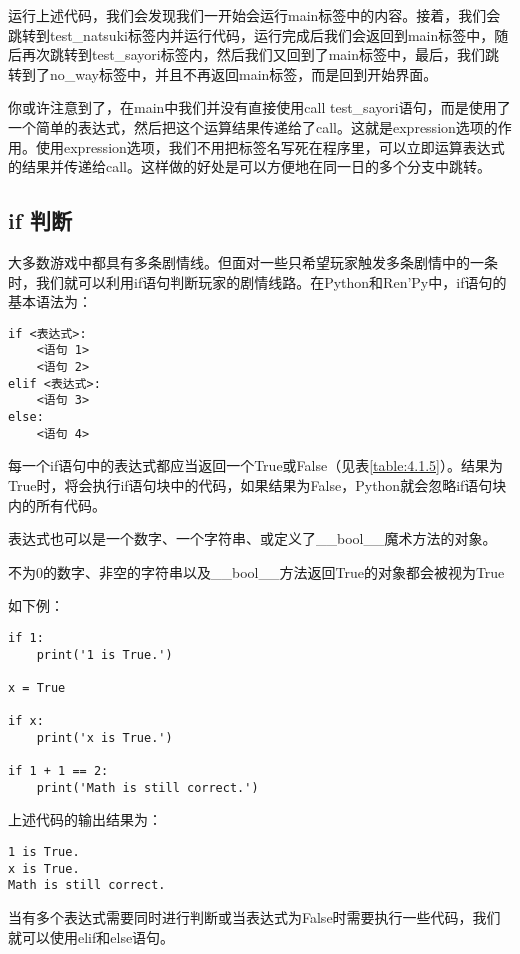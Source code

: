 运行上述代码，我们会发现我们一开始会运行main标签中的内容。接着，我们会跳转到test\_natsuki标签内并运行代码，运行完成后我们会返回到main标签中，随后再次跳转到test\_sayori标签内，然后我们又回到了main标签中，最后，我们跳转到了no\_way标签中，并且不再返回main标签，而是回到开始界面。

你或许注意到了，在main中我们并没有直接使用call test\_sayori语句，而是使用了一个简单的表达式，然后把这个运算结果传递给了call。这就是expression选项的作用。使用expression选项，我们不用把标签名写死在程序里，可以立即运算表达式的结果并传递给call。这样做的好处是可以方便地在同一日的多个分支中跳转。

\subsection{if 判断}
大多数游戏中都具有多条剧情线。但面对一些只希望玩家触发多条剧情中的一条时，我们就可以利用if语句判断玩家的剧情线路。在Python和Ren'Py中，if语句的基本语法为：
\begin{lstlisting}
if <表达式>:
    <语句 1>
    <语句 2>
elif <表达式>:
    <语句 3>
else:
    <语句 4>
\end{lstlisting}

每一个if语句中的表达式都应当返回一个True或False（见表\ref{table:4.1.5}）。结果为True时，将会执行if语句块中的代码，如果结果为False，Python就会忽略if语句块内的所有代码。

\begin{ExtraKnowledge}
    表达式也可以是一个数字、一个字符串、或定义了\_\_bool\_\_魔术方法的对象。

    不为0的数字、非空的字符串以及\_\_bool\_\_方法返回True的对象都会被视为True
\end{ExtraKnowledge}

如下例：

\begin{lstlisting}
if 1:
    print('1 is True.')

x = True

if x:
    print('x is True.')

if 1 + 1 == 2:
    print('Math is still correct.')
\end{lstlisting}

上述代码的输出结果为：
\begin{lstlisting}
1 is True.
x is True.
Math is still correct.
\end{lstlisting}

当有多个表达式需要同时进行判断或当表达式为False时需要执行一些代码，我们就可以使用elif和else语句。

